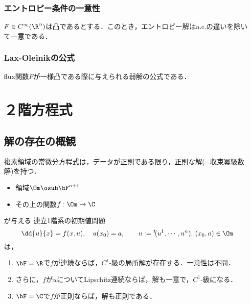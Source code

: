 \documentclass[uplatex,dvipdfmx]{jsreport}
\begin{document}
\subsection{エントロピー条件の一意性}

\begin{theorem}
    $F\in C^\infty(\R^n)$は凸であるとする．このとき，エントロピー解はa.e.の違いを除いて一意である．
\end{theorem}

\subsection{Lax-Oleinikの公式}

flux関数$F$が一様凸である際に与えられる弱解の公式である．

\chapter{２階方程式}

\section{解の存在の概観}

\begin{tcolorbox}[colframe=ForestGreen, colback=ForestGreen!10!white,breakable,colbacktitle=ForestGreen!40!white,coltitle=black,fonttitle=\bfseries\sffamily,
title=]
    複素領域の常微分方程式は，データが正則である限り，正則な解(=収束冪級数解)を持つ\cite{竹井義次-RIMS-テキスト}．
\end{tcolorbox}

\begin{remarks}[正規形ODEの性質まとめ]\mbox{}
    \begin{itemize}
        \item 領域$\Om\osub\bF^{n+1}$
        \item その上の関数$f:\Om\to\C$
    \end{itemize}
    が与える
    連立1階系の初期値問題
    \[\dd{u}{x}=f(x,u),\quad u(x_0)=a,\qquad u:={}^t\!(u^1,\cdots,u^n),\,(x_0,a)\in\Om\]
    は，
    \begin{enumerate}
        \item $\bF=\R$で$f$が連続ならば，$C^1$-級の局所解が存在する．一意性は不問．
        \item さらに，$f$が$u$についてLipschitz連続ならば，解も一意で，$C^1$-級になる．
        \item $\bF=\C$で$f$が正則ならば，解も正則である．
    \end{enumerate}
\end{remarks}
\end{document}
